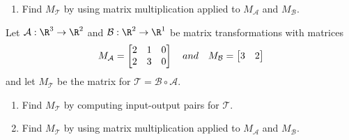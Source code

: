 \begin{exercises}
\begin{problist}
\begin{enumerate}
			\item Find $M_{\mathcal T}$ by using matrix multiplication applied
				to $M_{\mathcal A}$ and $M_{\mathcal B}$.
		\end{enumerate}

		\prob Let $\mathcal A: \R^{3} \to \R^{2}$ and
		$\mathcal B: \R^{2} \to \R^{1}$ be matrix transformations with
		matrices
		\[
			M_{\mathcal A}= \mat{2&1&0\\2&3&0}\quad and \quad M_{\mathcal
			B}= \mat{3&2}
		\]
		 and let $M_{\mathcal T}$ be the matrix for $\mathcal T=\mathcal B\circ \mathcal A$.
		\begin{enumerate}
			\item Find $M_{\mathcal T}$ by computing input-output pairs for $\mathcal
				T$.

			\item Find $M_{\mathcal T}$ by using matrix multiplication applied
				to $M_{\mathcal A}$ and $M_{\mathcal B}$.
		\end{enumerate}
	\end{problist}
\end{exercises}
